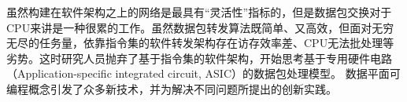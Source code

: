 虽然构建在软件架构之上的网络是最具有“灵活性”指标的，但是数据包交换对于CPU来讲是一种很累的工作。虽然数据包转发算法既简单、又高效，但面对无穷无尽的任务量，依靠指令集的软件转发架构存在访存效率差、CPU无法批处理等劣势。这时研究人员抛弃了基于指令集的软件架构，开始思考基于专用硬件电路（Application-specific integrated circuit, ASIC）的数据包处理模型。
%
数据平面可编程概念引发了众多新技术，并为解决不同问题所提出的创新实践。
